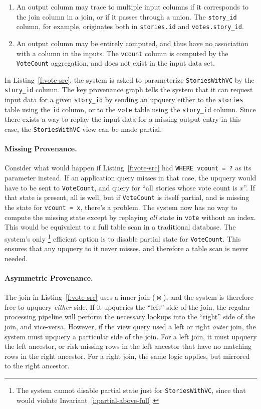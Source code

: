 \begin{enumerate}
  \item An output column may trace to multiple input columns if it corresponds
    to the join column in a join, or if it passes through a union. The
    \texttt{story\_id} column, for example, originates both in
    \texttt{stories.id} and \texttt{votes.story\_id}.
  \item An output column may be entirely computed, and thus have no association
    with a column in the inputs. The \texttt{vcount} column is computed by the
    \texttt{VoteCount} aggregation, and does not exist in the input data set.
\end{enumerate}

In Listing~\ref{f:vote-src}, the system is asked to parameterize
\texttt{StoriesWithVC} by the \texttt{story\_id} column. The key provenance
graph tells the system that it can request input data for a given
\texttt{story\_id} by sending an upquery either to the \texttt{stories} table
using the \texttt{id} column, or to the \texttt{vote} table using the
\texttt{story\_id} column. Since there exists a way to replay the input data for
a missing output entry in this case, the \texttt{StoriesWithVC} view can be made
partial.

\paragraph{Missing Provenance.}
Consider what would happen if Listing~\ref{f:vote-src} had \texttt{WHERE vcount
= ?} as its parameter instead. If an application query misses in that case, the
upquery would have to be sent to \texttt{VoteCount}, and query for ``all stories
whose vote count is $x$''. If that state is present, all is well, but if
\texttt{VoteCount} is itself partial, and is missing the state for
\texttt{vcount = x}, there's a problem. The system now has no way to compute the
missing state except by replaying \emph{all} state in \texttt{vote} without an
index. This would be equivalent to a full table scan in a traditional database.
The system's only%
%
\footnote{The system cannot disable partial state just for
\texttt{StoriesWithVC}, since that would violate
Invariant~\ref{i:partial-above-full}.}
%
efficient option is to disable partial
state for \texttt{VoteCount}. This ensures that any upquery to it never misses,
and therefore a table scan is never needed.

\paragraph{Asymmetric Provenance.}
The join in Listing~\ref{f:vote-src} uses a inner join ($\bowtie$), and the
system is therefore free to upquery \emph{either} side. If it upqueries the
``left'' side of the join, the regular processing pipeline will perform the
necessary lookups into the ``right'' side of the join, and vice-versa. However,
if the view query used a left or right \emph{outer} join, the system must
upquery a particular side of the join. For a left join, it must upquery the left
ancestor, or risk missing rows in the left ancestor that have no matching rows
in the right ancestor. For a right join, the same logic applies, but mirrored to
the right ancestor.

